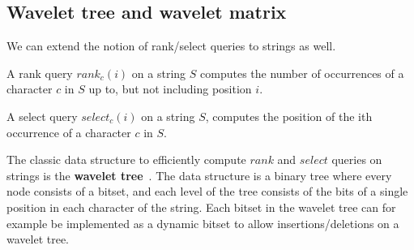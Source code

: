 \subsection*{Wavelet tree and wavelet matrix}

We can extend the notion of rank/select queries to strings as well. 

\begin{definition}

    A rank query $rank_c(i)$ on a string $S$ computes the number of occurrences of a
    character $c$ in $S$ up to, but not including position $i$.

\end{definition}
\begin{definition}

    A select query $select_c(i)$ on a string $S$, computes the position of the ith
    occurrence of a character $c$ in $S$. 

\end{definition}

The classic data structure to efficiently compute $rank$ and $select$ queries on strings
is the \textbf{wavelet tree}~\cite{WaveletTree}. The data structure is a binary tree where every
node consists of a bitset, and each level of the tree consists of the bits of a single
position in each character of the string. Each bitset in the wavelet tree can for example
be implemented as a dynamic bitset to allow insertions/deletions on a wavelet tree.


